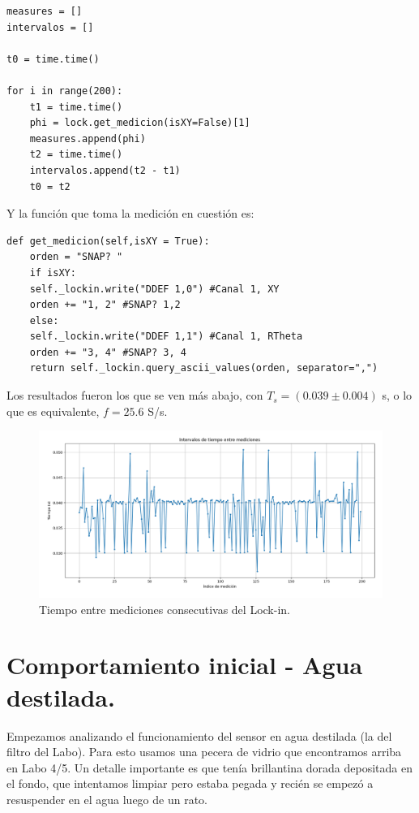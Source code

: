 \begin{lstlisting}
measures = []
intervalos = []
	
t0 = time.time()
	
for i in range(200):
	t1 = time.time()
	phi = lock.get_medicion(isXY=False)[1]
	measures.append(phi)
	t2 = time.time()
	intervalos.append(t2 - t1)  
	t0 = t2
\end{lstlisting}

Y la función que toma la medición en cuestión es:

\begin{lstlisting}
def get_medicion(self,isXY = True):
	orden = "SNAP? "
	if isXY:
	self._lockin.write("DDEF 1,0") #Canal 1, XY
	orden += "1, 2" #SNAP? 1,2
	else:
	self._lockin.write("DDEF 1,1") #Canal 1, RTheta
	orden += "3, 4" #SNAP? 3, 4
	return self._lockin.query_ascii_values(orden, separator=",")
\end{lstlisting}	
	
Los resultados fueron los que se ven más abajo, con $T_s = (0.039 \pm 0.004)$ s, o lo que es equivalente, $f=25.6$ S/s.

\begin{figure}[th!]
	\centering
	\includegraphics[width=0.87\linewidth]{Figures/19_05_2025/Frecuencia_de_sampleo}
	\caption{Tiempo entre mediciones consecutivas del Lock-in.}
	\label{fig:frecuenciadesampleo}
\end{figure}


\section{Comportamiento inicial - Agua destilada.}
Empezamos analizando el funcionamiento del sensor en agua destilada (la del filtro del Labo). Para esto usamos una pecera de vidrio que encontramos arriba en Labo 4/5. Un detalle importante es que tenía brillantina dorada depositada en el fondo, que intentamos limpiar pero estaba pegada y recién se empezó a resuspender en el agua luego de un rato. 

